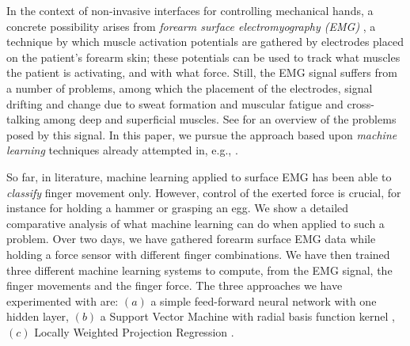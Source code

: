 In the context of non-invasive interfaces for controlling mechanical
hands, a concrete possibility arises from \emph{forearm surface
electromyography (EMG)} \cite{zecca}, a technique by which muscle
activation potentials are gathered by electrodes placed on the
patient's forearm skin; these potentials can be used to track what
muscles the patient is activating, and with what force.  Still, the
EMG signal suffers from a number of problems, among which the
placement of the electrodes, signal drifting and change due to sweat
formation and muscular fatigue and cross-talking among deep and
superficial muscles. See \cite{deluca} for an overview of the problems
posed by this signal. In this paper, we pursue the approach based upon
\emph{machine learning} techniques already attempted in, e.g.,
\cite{dunlop,fukuda,smagt}.


So far, in literature, machine learning applied to surface EMG has
been able to \emph{classify} finger movement only.  However,
control of the exerted force is crucial, for instance for holding
a hammer or grasping an egg. We show a detailed comparative
analysis of what machine learning can do when applied to such a
problem. Over two days, we have gathered forearm surface EMG data
while holding a force sensor with different finger combinations.
We have then trained three different machine learning systems to
compute, from the EMG signal, the finger movements and the finger
force. The three approaches we have experimented with are: $(a)$ a
simple feed-forward neural network with one hidden layer, $(b)$ a
Support Vector Machine with radial basis function kernel
\cite{BGV92}, $(c)$ Locally Weighted Projection Regression
\cite{lwpr}.

